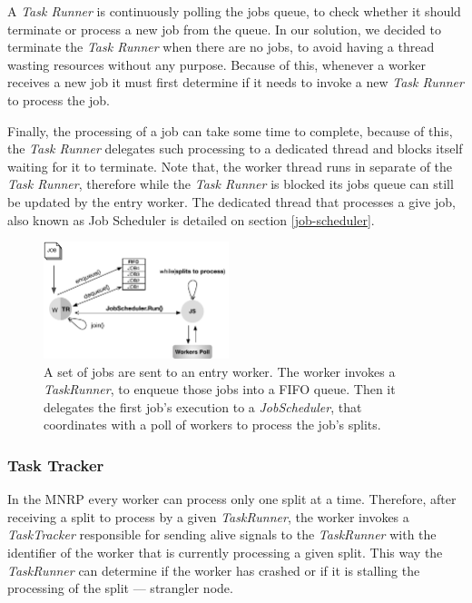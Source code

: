 \documentclass[times, 10pt,twocolumn]{article}
\begin{document}
            A \emph{Task Runner} is continuously polling the jobs queue, to check whether it should terminate or process a new job from the queue. In our solution, we decided to terminate the \emph{Task Runner} when there are no jobs, to avoid having a thread wasting resources without any purpose. Because of this, whenever a worker receives a new job it must first determine if it needs to invoke a new \emph{Task Runner} to process the job.
            
            Finally, the processing of a job can take some time to complete, because of this, the \emph{Task Runner} delegates such processing to a dedicated thread and blocks itself waiting for it to terminate. Note that, the worker thread runs in separate of the \emph{Task Runner}, therefore while the \emph{Task Runner} is blocked its jobs queue can still be updated by the entry worker. The dedicated thread that processes a give job, also known as Job Scheduler is detailed on section \ref{job-scheduler}.

            \begin{figure}[h]
                \begin{center}
                    \includegraphics[width=0.48\textwidth]{pics/taskrunner-example.pdf}
                    \caption{A set of jobs are sent to an entry worker. The worker invokes a \textit{TaskRunner}, to enqueue those jobs into a FIFO queue. Then it delegates the first job's execution to a \textit{JobScheduler}, that coordinates with a poll of workers to process the job's splits.}
                    \label{fig:mnr-taskrunner-example}
                \end{center}
            \end{figure}

            \subsubsection{Task Tracker}

           In the \ac{MNRP} every worker can process only one split at a time. Therefore, after receiving a split to process by a given \textit{TaskRunner}, the worker invokes a \textit{TaskTracker} responsible for sending alive signals to the \textit{TaskRunner} with the identifier of the worker that is currently processing a given split. This way the \textit{TaskRunner} can determine if the worker has crashed or if it is stalling the processing of the split — strangler node.
\end{document}
